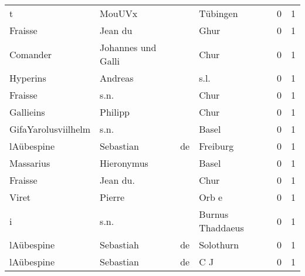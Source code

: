 \documentclass[10pt,a4paper,landscape]{article}
\begin{document}
\begin{longtable}{llllrr}
                        t &                             MouUVx &             &                                    Tübingen &          0 &         1 \\
                  Fraisse &                            Jean du &             &                                        Ghur &          0 &         1 \\
                 Comander &                 Johannes und Galli &             &                                        Chur &          0 &         1 \\
                 Hyperins &                            Andreas &             &                                        s.l. &          0 &         1 \\
                  Fraisse &                               s.n. &             &                                        Chur &          0 &         1 \\
                Gallieins &                            Philipp &             &                                        Chur &          0 &         1 \\
      GifaYarolusviilhelm &                               s.n. &             &                                       Basel &          0 &         1 \\
               lAübespine &                          Sebastian &          de &                                    Freiburg &          0 &         1 \\
                Massarius &                         Hieronymus &             &                                       Basel &          0 &         1 \\
                  Fraisse &                           Jean du. &             &                                        Chur &          0 &         1 \\
                    Viret &                             Pierre &             &                                       Orb e &          0 &         1 \\
                        i &                               s.n. &             &                            Burnus Thaddaeus &          0 &         1 \\
               lAübespine &                          Sebastiah &          de &                                   Solothurn &          0 &         1 \\
               lAübespine &                          Sebastian &          de &                                         C J &          0 &         1 \\

\end{longtable}
\end{document}
